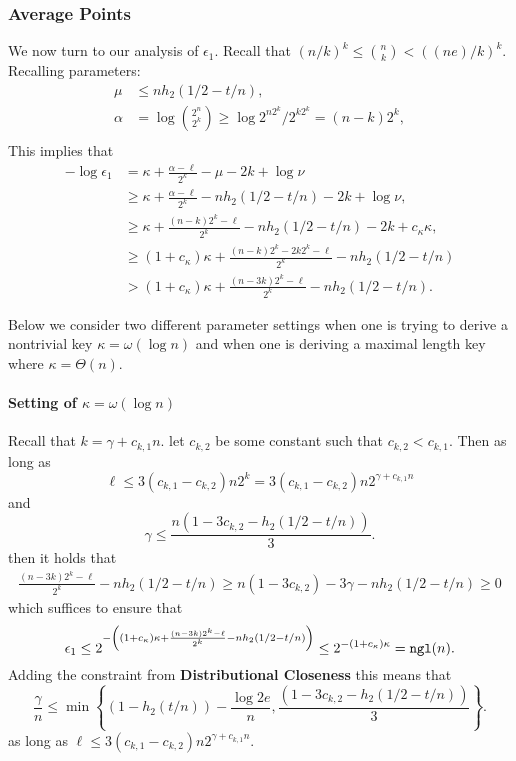 \subsubsection{Average Points} 
We now turn to our analysis of $\epsilon_1$.  Recall that $(n/k)^k \le {n\choose k} < ((ne)/k)^k$.  Recalling parameters: 
\begin{align*}
\mu&\le nh_2(1/2-t/n),\\
\alpha &= \log{2^n\choose 2^k} \ge \log{2^{n2^k} /2^{k2^k}} = (n-k)2^k,\\
\end{align*}
This implies that 
\begin{align*}
-\log{\epsilon_1}&= \kappa+\frac{\alpha-\ell}{2^k} - \mu -2k+\log{\nu}\\
&\ge  \kappa+\frac{\alpha -\ell}{2^k} - nh_2(1/2-t/n) - 2k+\log{\nu},\\
&\ge  \kappa+\frac{(n-k)2^k-\ell}{2^k} - nh_2(1/2-t/n) - 2k+c_{\kappa}\kappa,\\
&\ge  (1+c_{\kappa})\kappa+\frac{(n-k)2^k-2k2^{k}-\ell}{2^k} - nh_2(1/2-t/n)\\
&>  (1+c_{\kappa})\kappa+\frac{(n-3k)2^k-\ell}{2^k} - nh_2(1/2-t/n) .
\end{align*}

Below we consider two different parameter settings when one is trying to derive a nontrivial key $\kappa = \omega(\log n)$ and when one is deriving a maximal length key where $\kappa = \Theta(n)$.
\paragraph{Setting of $\kappa =\omega(\log n)$} 
Recall that $k = \gamma+c_{k,1}n$. let $c_{k,2}$ be some constant such that $c_{k,2}<c_{k,1}$. Then as long as
\[
\ell\le 3(c_{k,1}-c_{k,2}) n2^k= 3(c_{k,1}-c_{k,2})n2^{\gamma+c_{k,1}n}
\]
and 
\[
\gamma \le \frac{n(1-3c_{k,2} - h_2(1/2-t/n))}{3}.
\]
 then it holds that 
\begin{align*}
\frac{(n-3k)2^k-\ell}{2^k} - nh_2(1/2-t/n) 
\ge n(1-3c_{k,2}) - 3\gamma - nh_2(1/2-t/n) \ge 0
\end{align*}
which suffices to ensure that 
\[
\epsilon_1 \le   2^{-\left((1+c_{\kappa})\kappa+\frac{(n-3k)2^k-\ell}{2^k} - nh_2(1/2-t/n) \right)} \le  2^{-(1+c_{\kappa})\kappa} = \mathtt{ngl}(n).
\]
\noindent
Adding the constraint from \textbf{Distributional Closeness}
this means that 
\[
\frac{\gamma}{n} \le \min\left\{(1-h_2(t/n)) - \frac{\log{2e}}{n}, \frac{(1-3c_{k,2} - h_2(1/2-t/n))}{3}\right\}.
\]
as long as $\ell\le 3(c_{k,1}-c_{k,2})n2^{\gamma+c_{k,1}n}.$

